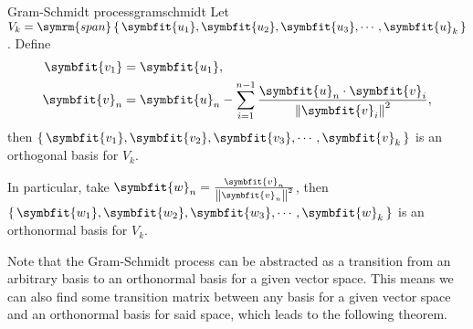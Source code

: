 \documentclass[math]{amznotes}
\theoremstyle{remark}
\begin{document}
\begin{thmbox}{Gram-Schmidt process}{gramschmidt}
    Let $V_k = \symrm{span}\left\{\, \symbfit{u_1}, \symbfit{u_2}, \symbfit{u_3}, \cdots, \symbfit{u}_k \,\right\}$. Define
    \begin{align*}
        \symbfit{v_1} & = \symbfit{u_1},                                                                                                          \\
        \symbfit{v}_n & = \symbfit{u}_n - \sum_{i = 1}^{n - 1}\frac{\symbfit{u}_n \cdot \symbfit{v}_i}{\left\lVert \symbfit{v}_i \right\rVert^2},
    \end{align*}
    then $\left\{\, \symbfit{v_1}, \symbfit{v_2}, \symbfit{v_3}, \cdots, \symbfit{v}_k \,\right\}$ is an orthogonal basis for $V_k$.

    In particular, take $\symbfit{w}_n = \frac{\symbfit{v}_n}{\left\lVert \symbfit{v}_n \right\rVert^2}$, then $\left\{\, \symbfit{w_1}, \symbfit{w_2}, \symbfit{w_3}, \cdots, \symbfit{w}_k \,\right\}$ is an orthonormal basis for $V_k$.
\end{thmbox}
Note that the Gram-Schmidt process can be abstracted as a transition from an arbitrary basis to an orthonormal basis for a given vector space. This means we can also find some transition matrix between any basis for a given vector space and an orthonormal basis for said space, which leads to the following theorem.
\end{document}
